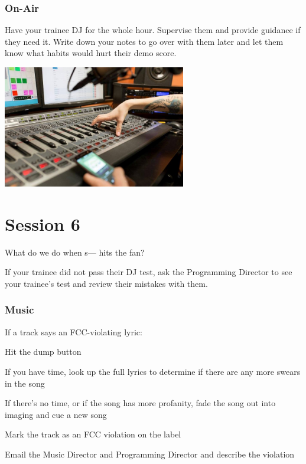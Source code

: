 \documentclass{witrman}
\begin{document}
\subsection{On-Air}

Have your trainee DJ for the whole hour.  Supervise them and provide guidance if
they need it.  Write down your notes to go over with them later and let them
know what habits would hurt their demo score.

\begin{center}
    \includegraphics[width=8cm]{images/console}
\end{center}


\chapter{Session 6}

What do we do when s--- hits the fan?

If your trainee did not pass their DJ test, ask the Programming Director to see
your trainee's test and review their mistakes with them.

\subsection{Music}

If a track says an FCC-violating lyric:
\begin{skinnyenumerate}
    \item Hit the dump button
    \item If you have time, look up the full lyrics to determine if there are
        any more swears in the song
    \item If there's no time, or if the song has more profanity, fade the song
        out into imaging and cue a new song
    \item Mark the track as an FCC violation on the label
    \item Email the Music Director and Programming Director and describe the
        violation
\end{skinnyenumerate}
\end{document}
